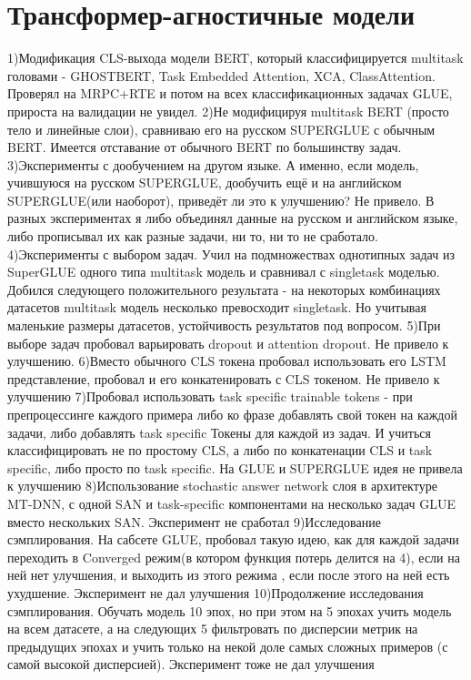 \chapter{Трансформер-агностичные модели}\label{ch:tr-ag}

1)Модификация CLS-выхода модели BERT, который классифицируется multitask головами - GHOSTBERT, Task Embedded Attention, XCA, ClassAttention. Проверял на MRPC+RTE и потом на всех классификационных задачах GLUE, прироста на валидации не увидел.
2)Не модифицируя multitask BERT (просто тело и линейные слои), сравниваю его на русском SUPERGLUE с обычным BERT. Имеется отставание от обычного BERT по большинству задач.
3)Эксперименты с дообучением на другом языке. А именно, если модель, учившуюся на русском SUPERGLUE, дообучить ещё и на английском SUPERGLUE(или наоборот), приведёт ли это к улучшению? Не привело. В разных экспериментах я либо объединял данные на русском и английском языке, либо прописывал их как разные задачи, ни то, ни то не сработало.
4)Эксперименты с выбором задач. Учил на подмножествах однотипных задач из SuperGLUE одного типа multitask модель и сравнивал с singletask моделью. Добился следующего положительного результата - на некоторых комбинациях датасетов multitask модель несколько превосходит singletask. Но учитывая маленькие размеры датасетов, устойчивость результатов под вопросом.
5)При выборе задач пробовал варьировать dropout и attention dropout. Не привело к улучшению.
6)Вместо обычного CLS токена пробовал использовать его LSTM представление, пробовал и его конкатенировать с CLS токеном. Не привело к улучшению
7)Пробовал использовать task specific trainable tokens - при препроцессинге каждого примера либо ко фразе добавлять свой токен на каждой задачи, либо добавлять task specific Токены для каждой из задач. И учиться классифицировать не по простому CLS, а либо по конкатенации CLS и task specific, либо просто по task specific. На GLUE и SUPERGLUE идея не привела к улучшению
8)Использование stochastic answer network слоя в архитектуре MT-DNN, с одной SAN и task-specific компонентами на несколько задач GLUE вместо нескольких SAN. Эксперимент не сработал
9)Исследование сэмплирования. На сабсете GLUE, пробовал такую идею, как для каждой задачи переходить в Converged режим(в котором функция потерь делится на 4), если на ней нет улучшения, и выходить из этого режима , если после этого на ней есть ухудшение. Эксперимент не дал улучшения
10)Продолжение исследования сэмплирования. Обучать модель 10 эпох, но при этом на 5 эпохах учить модель на всем датасете, а на следующих 5 фильтровать по дисперсии метрик на предыдущих эпохах и учить только на некой доле самых сложных примеров (с самой высокой дисперсией). Эксперимент тоже не дал улучшения





